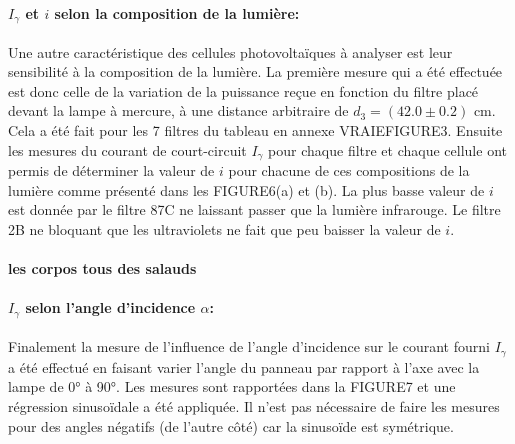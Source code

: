 \paragraph*{\(I_\gamma\) et \(i\) selon la composition de la lumière:}
Une autre caractéristique des cellules photovoltaïques à analyser est leur sensibilité à la composition de la lumière. La première mesure qui a été effectuée est donc celle de la variation de la puissance reçue en fonction du filtre placé devant la lampe à mercure, à une distance arbitraire de \(d_3 = (42.0 \pm 0.2)\) \unit{\centi\meter}. Cela a été fait pour les 7 filtres du tableau en annexe VRAIEFIGURE3. Ensuite les mesures du courant de court-circuit \(I_\gamma\) pour chaque filtre et chaque cellule ont permis de déterminer la valeur de \(i\) pour chacune de ces compositions de la lumière comme présenté dans les FIGURE6(a) et (b). La plus basse valeur de \(i\) est donnée par le filtre 87C ne laissant passer que la lumière infrarouge. Le filtre 2B ne bloquant que les ultraviolets ne fait que peu baisser la valeur de \(i\).

\paragraph*{les corpos tous des salauds}


\paragraph*{\(I_\gamma\) selon l'angle d'incidence \(\alpha\):}
Finalement la mesure de l'influence de l'angle d'incidence sur le courant fourni \(I_\gamma\) a été effectué en faisant varier l'angle du panneau par rapport à l'axe avec la lampe de 0° à 90°. Les mesures sont rapportées dans la FIGURE7 et une régression sinusoïdale a été appliquée. Il n'est pas nécessaire de faire les mesures pour des angles négatifs (de l'autre côté) car la sinusoïde est symétrique.






